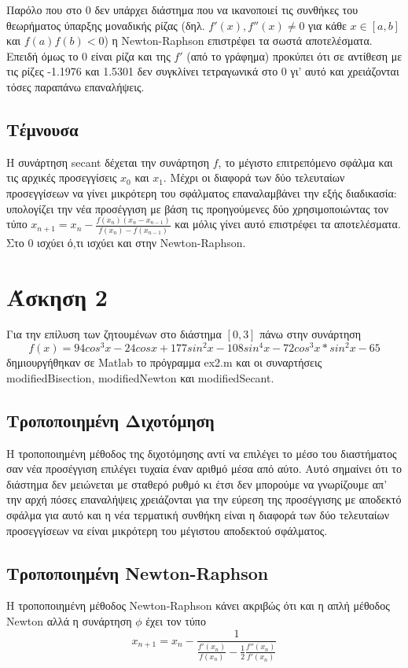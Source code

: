 \documentclass[a4paper,11pt]{article}
\begin{document}
\begin{flushleft}
Παρόλο που στο 0 δεν υπάρχει διάστημα που να ικανοποιεί τις συνθήκες του θεωρήματος ύπαρξης μοναδικής ρίζας (δηλ. $f'(x),f''(x)\neq0$ για κάθε $x\in[a,b]$ και $f(a)f(b)<0$) η Newton-Raphson επιστρέφει τα σωστά αποτελέσματα.
Επειδή όμως το 0 είναι ρίζα και της $f'$ (από το γράφημα) προκύπει ότι σε αντίθεση με τις ρίζες -1.1976 και 1.5301 δεν συγκλίνει τετραγωνικά στο 0 γι' αυτό και χρειάζονται τόσες παραπάνω επαναλήψεις.
\linebreak

\subsection*{Τέμνουσα}
Η συνάρτηση secant δέχεται την συνάρτηση $f$, το μέγιστο επιτρεπόμενο σφάλμα και τις αρχικές προσεγγίσεις $x_0$ και $x_1$. Μέχρι οι διαφορά των δύο τελευταίων προσεγγίσεων να γίνει μικρότερη του σφάλματος επαναλαμβάνει την εξής διαδικασία: υπολογίζει την νέα προσέγγιση με βάση τις προηγούμενες δύο χρησιμοποιώντας τον τύπο $x_{n+1} = x_n-\frac{f(x_n)(x_n-x_{n-1})}{f(x_n)-f(x_{n-1})}$ και μόλις γίνει αυτό επιστρέφει τα αποτελέσματα. 
\linebreak
Στο 0 ισχύει ό,τι ισχύει και στην Newton-Raphson.


\section*{Άσκηση 2}
Για την επίλυση των ζητουμένων στο διάστημα $[0,3]$ πάνω στην συνάρτηση $$f(x) = 94cos^3x-24cosx+177sin^2x-108sin^4x-72cos^3x*sin^2x-65$$  δημιουργήθηκαν σε Matlab το πρόγραμμα ex2.m και οι συναρτήσεις modifiedBisection, modifiedNewton και modifiedSecant.

\subsection*{Τροποποιημένη Διχοτόμηση}
Η τροποποιημένη μέθοδος της διχοτόμησης αντί να επιλέγει το μέσο του διαστήματος σαν νέα προσέγγιση επιλέγει τυχαία έναν αριθμό μέσα από αύτο. Αυτό σημαίνει ότι το διάστημα δεν μειώνεται με σταθερό ρυθμό κι έτσι δεν μπορούμε να γνωρίζουμε απ' την αρχή πόσες επαναλήψεις χρειάζονται για την εύρεση της προσέγγισης με αποδεκτό σφάλμα για αυτό και η νέα τερματική συνθήκη είναι η διαφορά των δύο τελευταίων προσεγγίσεων να είναι μικρότερη του μέγιστου αποδεκτού σφάλματος.
\linebreak


\subsection*{Τροποποιημένη Newton-Raphson}
Η τροποποιημένη μέθοδος Newton-Raphson κάνει ακριβώς ότι και η απλή μέθοδος Newton αλλά η συνάρτηση $\phi$ έχει τον τύπο $$x_{n+1} = x_n-\frac{1}{\frac{f'(x_n)}{f(x_n)}-\frac{1}{2}\frac{f''(x_n)}{f'(x_n)}}$$
\linebreak


\end{flushleft}
\end{document}
